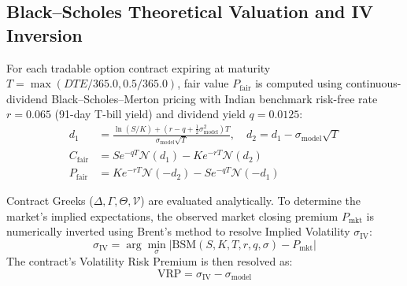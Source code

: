 \documentclass[journal]{IEEEtran}
\begin{document}
\subsection{Black--Scholes Theoretical Valuation and IV Inversion}
For each tradable option contract expiring at maturity $T = \max(DTE/365.0, 0.5/365.0)$, fair value $P_{\mathrm{fair}}$ is computed using continuous-dividend Black--Scholes--Merton pricing with Indian benchmark risk-free rate $r=0.065$ (91-day T-bill yield) and dividend yield $q=0.0125$:
\begin{equation}
\begin{aligned}
d_1 &= \frac{\ln(S/K) + (r - q + \frac{1}{2}\sigma_{\mathrm{model}}^2)T}{\sigma_{\mathrm{model}}\sqrt{T}}, \quad d_2 = d_1 - \sigma_{\mathrm{model}}\sqrt{T} \\
C_{\mathrm{fair}} &= S e^{-q T} \mathcal{N}(d_1) - K e^{-r T} \mathcal{N}(d_2) \\
P_{\mathrm{fair}} &= K e^{-r T} \mathcal{N}(-d_2) - S e^{-q T} \mathcal{N}(-d_1)
\end{aligned}
\end{equation}

Contract Greeks ($\Delta, \Gamma, \Theta, \mathcal{V}$) are evaluated analytically. To determine the market's implied expectations, the observed market closing premium $P_{\mathrm{mkt}}$ is numerically inverted using Brent's method to resolve Implied Volatility $\sigma_{\mathrm{IV}}$:
\begin{equation}
\sigma_{\mathrm{IV}} = \arg\min_{\sigma} \left| \mathrm{BSM}(S, K, T, r, q, \sigma) - P_{\mathrm{mkt}} \right|
\end{equation}
The contract's Volatility Risk Premium is then resolved as:
\begin{equation}
\mathrm{VRP} = \sigma_{\mathrm{IV}} - \sigma_{\mathrm{model}}
\end{equation}
\end{document}
